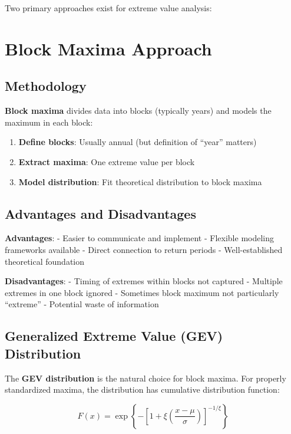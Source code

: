 \documentclass[
  letterpaper,
  DIV=11,
  numbers=noendperiod]{scrreprt}
\providecommand{\tightlist}{%
  \setlength{\itemsep}{0pt}\setlength{\parskip}{0pt}}
\begin{document}
Two primary approaches exist for extreme value analysis:

\section{Block Maxima Approach}\label{block-maxima-approach}

\subsection{Methodology}\label{methodology}

\textbf{Block maxima} divides data into blocks (typically years) and
models the maximum in each block:

\begin{enumerate}
\def\labelenumi{\arabic{enumi}.}
\tightlist
\item
  \textbf{Define blocks}: Usually annual (but definition of ``year''
  matters)
\item
  \textbf{Extract maxima}: One extreme value per block
\item
  \textbf{Model distribution}: Fit theoretical distribution to block
  maxima
\end{enumerate}

\subsection{Advantages and
Disadvantages}\label{advantages-and-disadvantages}

\textbf{Advantages}: - Easier to communicate and implement - Flexible
modeling frameworks available - Direct connection to return periods -
Well-established theoretical foundation

\textbf{Disadvantages}: - Timing of extremes within blocks not captured
- Multiple extremes in one block ignored - Sometimes block maximum not
particularly ``extreme'' - Potential waste of information

\subsection{Generalized Extreme Value (GEV)
Distribution}\label{generalized-extreme-value-gev-distribution}

The \textbf{GEV distribution} is the natural choice for block maxima.
For properly standardized maxima, the distribution has cumulative
distribution function:

\[F(x) = \exp\left\{-\left[1 + \xi\left(\frac{x - \mu}{\sigma}\right)\right]^{-1/\xi}\right\}\]
\end{document}
